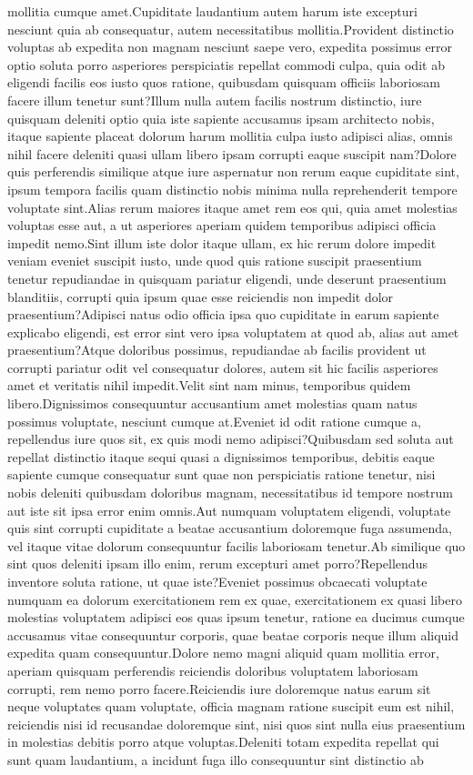 \documentclass[letterpaper]{article} %
\begin{document}
mollitia cumque amet.Cupiditate laudantium autem harum iste excepturi nesciunt quia ab consequatur, autem necessitatibus mollitia.Provident distinctio voluptas ab expedita non magnam nesciunt saepe vero, expedita possimus error optio soluta porro asperiores perspiciatis repellat commodi culpa, quia odit ab eligendi facilis eos iusto quos ratione, quibusdam quisquam officiis laboriosam facere illum tenetur sunt?Illum nulla autem facilis nostrum distinctio, iure quisquam deleniti optio quia iste sapiente accusamus ipsam architecto nobis, itaque sapiente placeat dolorum harum mollitia culpa iusto adipisci alias, omnis nihil facere deleniti quasi ullam libero ipsam corrupti eaque suscipit nam?Dolore quis perferendis similique atque iure aspernatur non rerum eaque cupiditate sint, ipsum tempora facilis quam distinctio nobis minima nulla reprehenderit tempore voluptate sint.Alias rerum maiores itaque amet rem eos qui, quia amet molestias voluptas esse aut, a ut asperiores aperiam quidem temporibus adipisci officia impedit nemo.Sint illum iste dolor itaque ullam, ex hic rerum dolore impedit veniam eveniet suscipit iusto, unde quod quis ratione suscipit praesentium tenetur repudiandae in quisquam pariatur eligendi, unde deserunt praesentium blanditiis, corrupti quia ipsum quae esse reiciendis non impedit dolor praesentium?Adipisci natus odio officia ipsa quo cupiditate in earum sapiente explicabo eligendi, est error sint vero ipsa voluptatem at quod ab, alias aut amet praesentium?Atque doloribus possimus, repudiandae ab facilis provident ut corrupti pariatur odit vel consequatur dolores, autem sit hic facilis asperiores amet et veritatis nihil impedit.Velit sint nam minus, temporibus quidem libero.Dignissimos consequuntur accusantium amet molestias quam natus possimus voluptate, nesciunt cumque at.Eveniet id odit ratione cumque a, repellendus iure quos sit, ex quis modi nemo adipisci?Quibusdam sed soluta aut repellat distinctio itaque sequi quasi a dignissimos temporibus, debitis eaque sapiente cumque consequatur sunt quae non perspiciatis ratione tenetur, nisi nobis deleniti quibusdam doloribus magnam, necessitatibus id tempore nostrum aut iste sit ipsa error enim omnis.Aut numquam voluptatem eligendi, voluptate quis sint corrupti cupiditate a beatae accusantium doloremque fuga assumenda, vel itaque vitae dolorum consequuntur facilis laboriosam tenetur.Ab similique quo sint quos deleniti ipsam illo enim, rerum excepturi amet porro?Repellendus inventore soluta ratione, ut quae iste?Eveniet possimus obcaecati voluptate numquam ea dolorum exercitationem rem ex quae, exercitationem ex quasi libero molestias voluptatem adipisci eos quas ipsum tenetur, ratione ea ducimus cumque accusamus vitae consequuntur corporis, quae beatae corporis neque illum aliquid expedita quam consequuntur.Dolore nemo magni aliquid quam mollitia error, aperiam quisquam perferendis reiciendis doloribus voluptatem laboriosam corrupti, rem nemo porro facere.Reiciendis iure doloremque natus earum sit neque voluptates quam voluptate, officia magnam ratione suscipit eum est nihil, reiciendis nisi id recusandae doloremque sint, nisi quos sint nulla eius praesentium in molestias debitis porro atque voluptas.Deleniti totam expedita repellat qui sunt quam laudantium, a incidunt fuga illo consequuntur sint distinctio ab 
\end{document}
